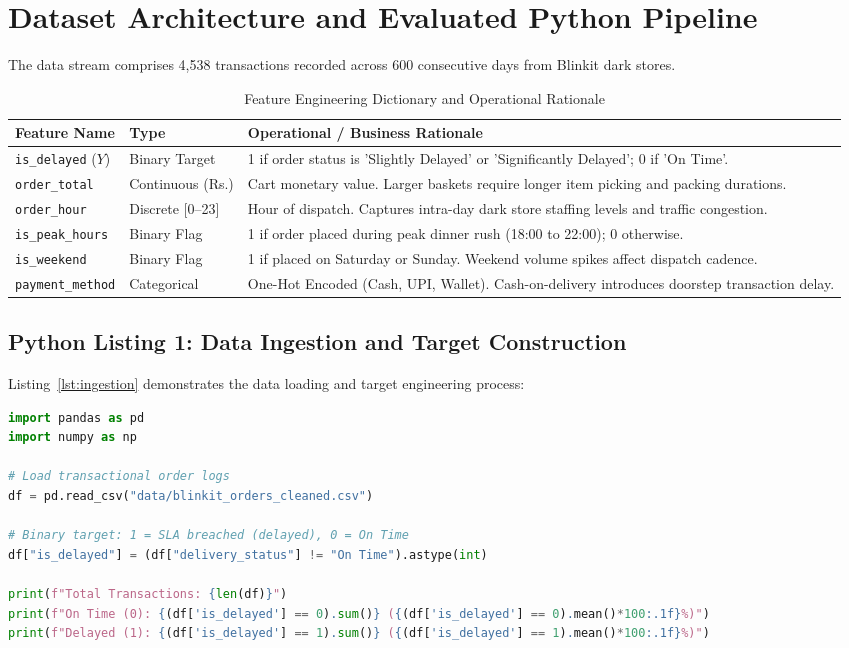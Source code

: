 \documentclass[11pt,a4paper]{article}
\begin{document}
\section{Dataset Architecture and Evaluated Python Pipeline}
\label{sec:implementation}

The data stream comprises 4,538 transactions recorded across 600 consecutive days from Blinkit dark stores.

\begin{table}[H]
\centering
\caption{Feature Engineering Dictionary and Operational Rationale}
\label{tab:features}
\begin{tabularx}{\linewidth}{llp{7.5cm}}
\toprule
\textbf{Feature Name} & \textbf{Type} & \textbf{Operational / Business Rationale} \\
\midrule
\texttt{is\_delayed} ($Y$) & Binary Target & 1 if order status is 'Slightly Delayed' or 'Significantly Delayed'; 0 if 'On Time'. \\
\texttt{order\_total} & Continuous (Rs.) & Cart monetary value. Larger baskets require longer item picking and packing durations. \\
\texttt{order\_hour} & Discrete [0--23] & Hour of dispatch. Captures intra-day dark store staffing levels and traffic congestion. \\
\texttt{is\_peak\_hours} & Binary Flag & 1 if order placed during peak dinner rush (18:00 to 22:00); 0 otherwise. \\
\texttt{is\_weekend} & Binary Flag & 1 if placed on Saturday or Sunday. Weekend volume spikes affect dispatch cadence. \\
\texttt{payment\_method} & Categorical & One-Hot Encoded (Cash, UPI, Wallet). Cash-on-delivery introduces doorstep transaction delay. \\
\bottomrule
\end{tabularx}
\end{table}

\subsection{Python Listing 1: Data Ingestion and Target Construction}
Listing~\ref{lst:ingestion} demonstrates the data loading and target engineering process:

\begin{lstlisting}[language=Python, caption={Data Ingestion and Binary SLA Breach Target Engineering}, label={lst:ingestion}]
import pandas as pd
import numpy as np

# Load transactional order logs
df = pd.read_csv("data/blinkit_orders_cleaned.csv")

# Binary target: 1 = SLA breached (delayed), 0 = On Time
df["is_delayed"] = (df["delivery_status"] != "On Time").astype(int)

print(f"Total Transactions: {len(df)}")
print(f"On Time (0): {(df['is_delayed'] == 0).sum()} ({(df['is_delayed'] == 0).mean()*100:.1f}%)")
print(f"Delayed (1): {(df['is_delayed'] == 1).sum()} ({(df['is_delayed'] == 1).mean()*100:.1f}%)")
\end{lstlisting}
\end{document}
